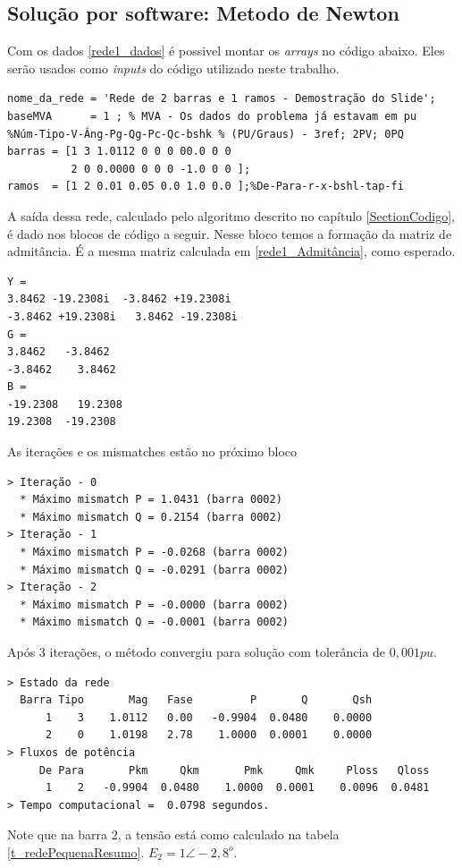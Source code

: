 \subsection{Solução por software: Metodo de Newton}
\label{SubsectionSolucaoRedePequenaNewton}
Com os dados \ref{rede1_dados} é possivel montar os \textit{arrays} no código abaixo. Eles serão usados como \textit{inputs} do código utilizado neste trabalho. 
\begin{verbatim}
nome_da_rede = 'Rede de 2 barras e 1 ramos - Demostração do Slide';
baseMVA      = 1 ; % MVA - Os dados do problema já estavam em pu
%Núm-Tipo-V-Âng-Pg-Qg-Pc-Qc-bshk % (PU/Graus) - 3ref; 2PV; 0PQ
barras = [1 3 1.0112 0 0 0 00.0 0 0
          2 0 0.0000 0 0 0 -1.0 0 0 ];
ramos  = [1 2 0.01 0.05 0.0 1.0 0.0 ];%De-Para-r-x-bshl-tap-fi
\end{verbatim}
A saída dessa rede, calculado pelo algoritmo descrito no capítulo \ref{SectionCodigo}, é dado nos blocos de código a seguir.
Nesse bloco temos a formação da matriz de admitância. É a mesma matriz calculada em \ref{rede1_Admitância}, como esperado.
\begin{verbatim}
Y =
3.8462 -19.2308i  -3.8462 +19.2308i
-3.8462 +19.2308i   3.8462 -19.2308i
G =
3.8462   -3.8462
-3.8462    3.8462
B =
-19.2308   19.2308
19.2308  -19.2308
\end{verbatim}
As iterações e os mismatches estão no próximo bloco
\begin{verbatim}
> Iteração - 0
  * Máximo mismatch P = 1.0431 (barra 0002)
  * Máximo mismatch Q = 0.2154 (barra 0002)
> Iteração - 1
  * Máximo mismatch P = -0.0268 (barra 0002)
  * Máximo mismatch Q = -0.0291 (barra 0002)
> Iteração - 2
  * Máximo mismatch P = -0.0000 (barra 0002)
  * Máximo mismatch Q = -0.0001 (barra 0002)
\end{verbatim}
Após 3 iterações, o método convergiu para solução com tolerância de $0,001pu$.
\begin{verbatim}
> Estado da rede
  Barra Tipo       Mag   Fase         P       Q       Qsh
      1    3    1.0112   0.00   -0.9904  0.0480    0.0000 
      2    0    1.0198   2.78    1.0000  0.0001    0.0000 
> Fluxos de potência
     De Para       Pkm     Qkm       Pmk     Qmk     Ploss   Qloss
      1    2   -0.9904  0.0480    1.0000  0.0001    0.0096  0.0481
> Tempo computacional =  0.0798 segundos.
\end{verbatim}
Note que na barra $2$, a tensão está como calculado na tabela \ref{t_redePequenaResumo}. $E_2=1 \angle -2,8^o$.







